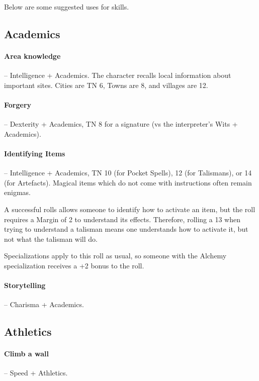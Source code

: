\begin{multicols}{2}

\noindent
Below are some suggested uses for skills.

\subsection{Academics}

\paragraph{Area knowledge } -- Intelligence + Academics.
The character recalls local information about important sites.
Cities are TN 6, Towns are 8, and villages are 12.

\paragraph{Forgery} -- Dexterity + Academics, TN 8 for a signature (vs the interpreter's Wits + Academics).

\label{magicidentification}
\paragraph{Identifying Items} -- Intelligence + Academics, TN 10 (for Pocket Spells), 12 (for Talismans), or 14 (for Artefacts).
Magical items which do not come with instructions often remain enigmas.

A successful rolls allows someone to identify how to activate an item, but the roll requires a Margin of 2 to understand its effects.
Therefore, rolling a 13 when trying to understand a talisman means one understands how to activate it, but not what the talisman will do.

Specializations apply to this roll as usual, so someone with the Alchemy specialization receives a +2 bonus to the roll.

\paragraph{Storytelling} -- Charisma + Academics.

\subsection{Athletics}

\paragraph{Climb a wall} -- Speed + Athletics.


\end{multicols}
